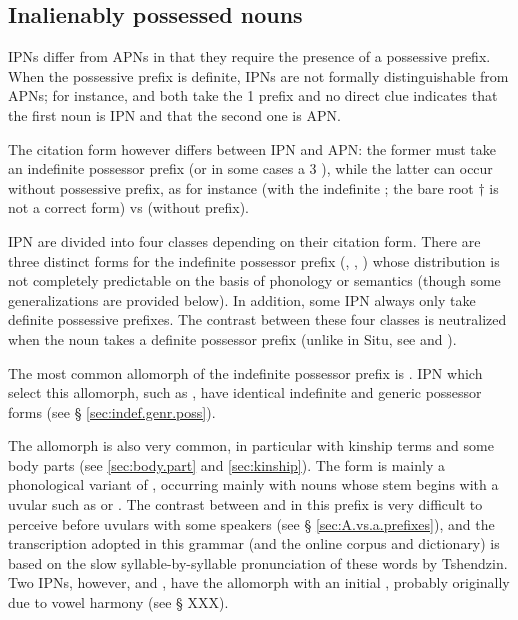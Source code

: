 \subsection{Inalienably possessed nouns} \label{sec:inalienably.possessed}
IPNs differ from APNs in that they require the presence of a possessive prefix.  When the possessive prefix is definite, IPNs are not formally distinguishable from APNs; for instance,  and  both take the 1\sg{}  prefix and no direct clue indicates that the first noun is IPN and that the second one is APN.

The citation form however differs between IPN and APN: the former must take an indefinite possessor prefix (or in some cases a 3\sg{} ), while the latter can occur without possessive prefix, as for instance  (with the indefinite ; the bare root $\dagger$ is not a correct form) vs  (without prefix).

IPN are divided into four classes depending on their citation form. There are three distinct forms for the indefinite possessor prefix (, , ) whose distribution is not completely predictable on the basis of phonology or semantics (though some generalizations are provided below). In addition, some IPN always only take definite possessive prefixes. The contrast between these four classes is neutralized when the noun takes a definite possessor prefix (unlike in Situ, see \citealt[168-169]{linxr93jiarongen} and \citealt[118-119]{prins16kyomkyo}).

The most common allomorph of the indefinite possessor prefix is . IPN which select this allomorph, such as , have identical indefinite and generic possessor forms (see § \ref{sec:indef.genr.poss}).

The allomorph  is also very common, in particular with kinship terms and some body parts (see \ref{sec:body.part} and \ref{sec:kinship}). The form  is mainly a phonological variant of , occurring mainly with nouns whose stem begins with a uvular such as  or . The contrast between  and  in this prefix is very difficult to perceive before uvulars with some speakers (see § \ref{sec:A.vs.a.prefixes}), and the transcription adopted in this grammar (and the online corpus and dictionary) is based on the slow syllable-by-syllable pronunciation of these words by Tshendzin. Two IPNs, however,  and , have the  allomorph with an initial , probably originally due to vowel harmony (see § XXX).

